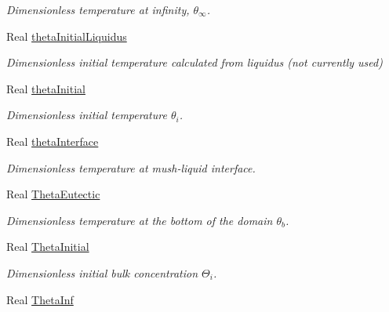 \begin{DoxyCompactItemize}
\begin{DoxyCompactList}\small\item\em Dimensionless temperature at infinity, $ \theta_\infty $. \end{DoxyCompactList}\item 
\hypertarget{class_mushy_layer_params_a5cbbc3540205aa69d2e54d1695c08c86}{Real \hyperlink{class_mushy_layer_params_a5cbbc3540205aa69d2e54d1695c08c86}{theta\-Initial\-Liquidus}}\label{class_mushy_layer_params_a5cbbc3540205aa69d2e54d1695c08c86}

\begin{DoxyCompactList}\small\item\em Dimensionless initial temperature calculated from liquidus (not currently used) \end{DoxyCompactList}\item 
\hypertarget{class_mushy_layer_params_a8f801f6995fcd9d6cbe8a99fb07c4aaf}{Real \hyperlink{class_mushy_layer_params_a8f801f6995fcd9d6cbe8a99fb07c4aaf}{theta\-Initial}}\label{class_mushy_layer_params_a8f801f6995fcd9d6cbe8a99fb07c4aaf}

\begin{DoxyCompactList}\small\item\em Dimensionless initial temperature $ \theta_i $. \end{DoxyCompactList}\item 
Real \hyperlink{class_mushy_layer_params_a4f5bbe8dd1098ccc6bac03fce6b6bfa0}{theta\-Interface}
\begin{DoxyCompactList}\small\item\em Dimensionless temperature at mush-\/liquid interface. \end{DoxyCompactList}\item 
Real \hyperlink{class_mushy_layer_params_add018c55cd0f09f969e3fa03872c6cf3}{Theta\-Eutectic}
\begin{DoxyCompactList}\small\item\em Dimensionless temperature at the bottom of the domain $ \theta_b $. \end{DoxyCompactList}\item 
\hypertarget{class_mushy_layer_params_ae326e39ee5950300791ce6d4a03657fc}{Real \hyperlink{class_mushy_layer_params_ae326e39ee5950300791ce6d4a03657fc}{Theta\-Initial}}\label{class_mushy_layer_params_ae326e39ee5950300791ce6d4a03657fc}

\begin{DoxyCompactList}\small\item\em Dimensionless initial bulk concentration $ \Theta_i $. \end{DoxyCompactList}\item 
\hypertarget{class_mushy_layer_params_ae6ea963354fd718de64b7fefc8d06446}{Real \hyperlink{class_mushy_layer_params_ae6ea963354fd718de64b7fefc8d06446}{Theta\-Inf}}\label{class_mushy_layer_params_ae6ea963354fd718de64b7fefc8d06446}


\end{DoxyCompactItemize}
